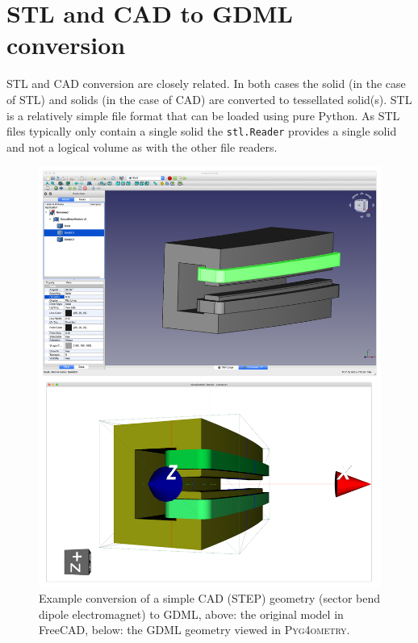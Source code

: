\documentclass[final,5p,times,twocolumn]{elsarticle}
\newcommand{\pyinline}[1]{\lstinline[postbreak={}]{#1}}
\newcommand{\PYGEOMETRY}{\textsc{Pyg4ometry}}
\begin{document}
\section{STL and CAD to GDML conversion}
STL and CAD conversion are closely related. In both cases the solid 
(in the case of STL) and solids (in the case of CAD) are converted to 
tessellated solid(s). STL is a relatively simple file format that can
be loaded using pure Python. As STL files typically only contain a single 
solid the \pyinline{stl.Reader} provides a single solid and not a logical volume
as with the other file readers.
%
\begin{figure}
\begin{center}
\includegraphics[width=0.9\columnwidth]{./model-scene/SectorBend.pdf}
\caption{Example conversion of a simple CAD (STEP) geometry (sector bend
  dipole electromagnet) to GDML, above: the original model in FreeCAD,
  below: the GDML geometry viewed in \PYGEOMETRY{}. }
\label{fig:cad-gdml}
\end{center}
\end{figure}
\end{document}
